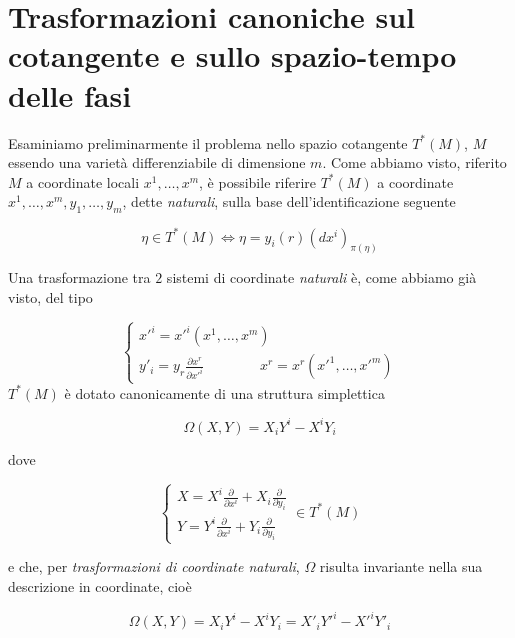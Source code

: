 \section{Trasformazioni canoniche sul cotangente e sullo spazio-tempo delle fasi}
Esaminiamo preliminarmente il problema nello spazio cotangente $ T^* (M) $, $ M $ essendo una varietà differenziabile di dimensione $ m $. Come abbiamo visto, riferito $ M $ a coordinate locali $ x^1, \dots , x^m $, è possibile riferire $ T^* (M) $ a coordinate $ x^1, \dots , x^m , y_1, \dots , y_m $, dette \textit{naturali}, sulla base dell'identificazione seguente

\begin{equation*}
\eta \in T^* (M) \Longleftrightarrow \eta = y_i (r) (dx^i)_{\pi (\eta)}
\end{equation*}

Una trasformazione tra $ 2 $ sistemi di coordinate \textit{naturali} è, come abbiamo già visto, del tipo

\begin{equation*}
\begin{cases}
x'^i = x'^i(x^1, \dots, x^m) \\
y'_i = y_r \frac{\partial x^r}{\partial x'^i} \qquad \qquad x^r = x^r (x'^1, \dots , x'^m)
\end{cases}
\end{equation*}
$ T^* (M) $ è dotato canonicamente di una struttura simplettica

\begin{equation*}
\Omega (X, Y) = X_i Y^i - X^i Y_i
\end{equation*}

dove

\begin{equation*}
\begin{cases}
X = X^i\frac{\partial}{\partial x^i} + X_i\frac{\partial}{\partial y_i} \\
Y = Y^i\frac{\partial}{\partial x^i} + Y_i\frac{\partial}{\partial y_i}
\end{cases}
\in T^* (M)
\end{equation*}

e che, per \textit{trasformazioni di coordinate naturali}, $ \Omega $ risulta invariante nella sua descrizione in coordinate, cioè

\begin{equation*}
\Omega (X, Y) =  X_i Y^i - X^i Y_i = X'_i Y'^i - X'^i Y'_i
\end{equation*}


